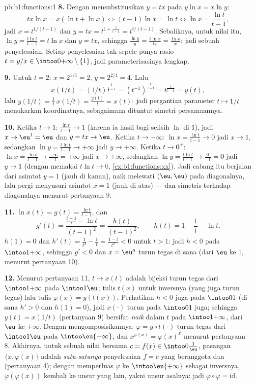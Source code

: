 \begin{solution}{pb:b1:functions:1}
\textbf{8.} Dengan mensubstitusikan $y = tx$ pada $y\ln x = x\ln y$:
\[
tx\ln x = x(\ln t + \ln x)
\iff (t - 1)\ln x = \ln t
\iff \ln x = \frac{\ln t}{t - 1} ,
\]
jadi $x = t^{1/(t-1)}$ dan $y = tx = t^{1 + \frac1{t-1}} =
t^{t/(t-1)}$. Sebaliknya, untuk nilai itu, $\ln y = \frac{t\ln
t}{t-1} = t\ln x$ dan $y = tx$, sehingga $\frac{\ln y}y = \frac{t\ln
x}{tx} = \frac{\ln x}x$: jadi sebuah penyelesaian. Setiap penyelesaian tak sepele punya
rasio $t = y/x \in \intoo0{+\infty} \setminus \{1\}$, jadi
parameterisasinya lengkap.

\textbf{9.} Untuk $t = 2$: $x = 2^{1/1} = 2$, $y = 2^{2/1} = 4$. Lalu
\[
x(1/t) = (1/t)^{\frac1{\frac1t - 1}}
= (t^{-1})^{\frac{t}{1 - t}}
= t^{\frac{t}{t - 1}} = y(t) ,
\]
lalu $y(1/t) = \frac1t\,x(1/t) = \frac{y(t)}t = x(t)$: jadi
pergantian parameter $t \mapsto 1/t$ menukarkan koordinatnya, sebagaimana
dituntut simetri persamaannya.

\textbf{10.} Ketika $t \to 1$: $\frac{\ln t}{t-1} \to 1$ (karena ia
hasil bagi selisih $\ln$ di $1$), jadi $x \to \eu^1 = \eu$ dan
$y = tx \to \eu$. Ketika $t \to +\infty$: $\ln x = \frac{\ln t}{t-1}
\to 0$ jadi $x \to 1$, sedangkan $\ln y = \frac{t\ln t}{t-1} \to
+\infty$ jadi $y \to +\infty$. Ketika $t \to 0^+$: $\ln x = \frac{\ln
t}{t-1} \to \frac{-\infty}{-1} = +\infty$ jadi $x \to +\infty$,
sedangkan $\ln y = \frac{t\ln t}{t-1} \to \frac{0}{-1} = 0$ jadi $y \to
1$ (dengan memakai $t\ln t \to 0$, \cref{ex:b1:functions:xx}). Jadi cabang
itu berjalan dari asimtot $y = 1$ (jauh di kanan), naik melewati
$(\eu, \eu)$ pada diagonalnya, lalu pergi menyusuri asimtot $x = 1$
(jauh di atas) --- dan simetris terhadap diagonalnya menurut pertanyaan 9.

\textbf{11.} $\ln x(t) = g(t) = \frac{\ln t}{t-1}$, dan
\[
g'(t) = \frac{\frac{t-1}t - \ln t}{(t-1)^2}
= \frac{h(t)}{(t-1)^2},
\qquad h(t) = 1 - \frac1t - \ln t .
\]
$h(1) = 0$ dan $h'(t) = \frac1{t^2} - \frac1t = \frac{1 -
t}{t^2} < 0$ untuk $t > 1$: jadi $h < 0$ pada $\intoo1{+\infty}$, sehingga $g' <
0$ dan $x = \eu^g$ turun tegas di sana (dari $\eu$ ke
$1$, menurut pertanyaan 10).

\textbf{12.} Menurut pertanyaan 11, $t \mapsto x(t)$ adalah bijeksi turun
tegas dari $\intoo1{+\infty}$ pada $\intoo1\eu$;
tulis $t(x)$ untuk inversnya (yang juga turun tegas) lalu tulis
$\varphi(x) = y(t(x))$. Perhatikan $h < 0$ juga pada $\intoo01$ (di sana
$h' > 0$ dan $h(1) = 0$), jadi $x(\cdot)$ turun pada
$\intoo01$ juga; sehingga $y(t) = x(1/t)$ (pertanyaan 9) bersifat
\emph{naik} dalam $t$ pada $\intoo1{+\infty}$, dari $\eu$ ke
$+\infty$. Dengan mengomposisikannya: $\varphi = y \circ t(\cdot)$ turun
tegas dari $\intoo1\eu$ pada $\intoo\eu{+\infty}$, dan
$x^{\varphi(x)} = \varphi(x)^x$ menurut pertanyaan 8. Akhirnya, untuk sebuah
nilai bersama $c = f(x) \in \intoo0{\frac1\eu}$, pasangan $\{x,
\varphi(x)\}$ adalah \emph{satu-satunya}  penyelesaian $f = c$ yang beranggota dua
(pertanyaan 4); dengan memperluas $\varphi$ ke $\intoo\eu{+\infty}$ sebagai
 inversnya, $\varphi(\varphi(x))$ kembali ke unsur yang lain, yakni
unsur asalnya: jadi $\varphi \circ \varphi = \mathrm{id}$.


\end{solution}

